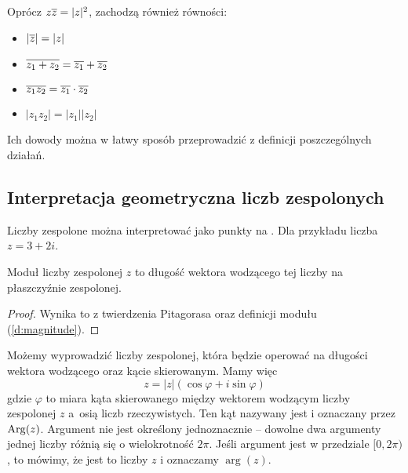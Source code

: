 \begin{lemma}
    Oprócz $z\overline{z} = |z|^2$, zachodzą również równości:
    \begin{itemize}
        \item $|\overline{z}| = |z|$
        \item $\overline{z_1 + z_2} = \overline{z_1} + \overline{z_2}$
        \item $\overline{z_1z_2} = \overline{z_1}\cdot\overline{z_2}$
        \item $|z_1z_2| = |z_1||z_2|$
    \end{itemize}
\end{lemma}
Ich dowody można w łatwy sposób przeprowadzić z definicji poszczególnych działań.

\subsection{Interpretacja geometryczna liczb zespolonych}
Liczby zespolone można interpretować jako punkty na . Dla przykładu liczba $z = 3 + 2i$.

\begin{center}
\end{center}

\begin{fact}
    Moduł liczby zespolonej $z$ to długość wektora wodzącego tej liczby na płaszczyźnie zespolonej.
\end{fact}
\begin{proof}
    Wynika to z twierdzenia Pitagorasa oraz definicji modułu (\ref{d:magnitude}).
\end{proof}

Możemy wyprowadzić  liczby zespolonej, która będzie operować na długości wektora wodzącego oraz kącie skierowanym. Mamy więc
\[ z = |z|(\cos\varphi + i\sin\varphi) \]
gdzie $\varphi$ to miara kąta skierowanego między wektorem wodzącym liczby zespolonej $z$ a~osią liczb rzeczywistych. Ten kąt nazywany jest  i oznaczany przez $\operatorname{Arg}(z)$. Argument nie jest określony jednoznacznie -- dowolne dwa argumenty jednej liczby różnią się o wielokrotność $2\pi$. Jeśli argument jest w przedziale $[0, 2\pi)$, to mówimy, że jest to  liczby $z$ i oznaczamy $\arg(z)$.

